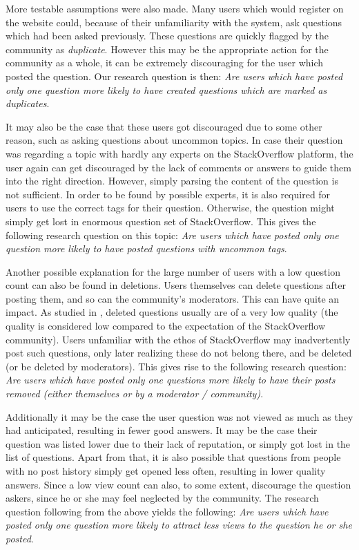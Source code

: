 \documentclass[conference]{IEEEtran}
\begin{document}
More testable assumptions were also made. Many users which would register on
the website could, because of their unfamiliarity with the system, ask
questions which had been asked previously. These questions are quickly flagged
by the community as \textit{duplicate}. However this may be the appropriate
action for the community as a whole, it can be extremely discouraging for the
user which posted the question. Our research question is then: \textit{Are
users which have posted only one question more likely to have created questions
which are marked as duplicates}.

It may also be the case that these users got discouraged due to some other
reason, such as asking questions about uncommon topics. In case their question
was regarding a topic with hardly any experts on the StackOverflow platform,
the user again can get discouraged by the lack of comments or answers to guide
them into the right direction. However, simply parsing the content of the
question is not sufficient. In order to be found by possible experts, it is
also required for users to use the correct tags for their question. Otherwise,
the question might simply get lost in enormous question set of StackOverflow.
This gives the following research question on this topic: \textit{Are users
which have posted only one question more likely to have posted questions with
uncommon tags}.

Another possible explanation for the large number of users with a low question
count can also be found in deletions. Users themselves can delete questions
after posting them, and so can the community's moderators. This can have quite
an impact. As studied in \cite{correa2014chaff}, deleted questions usually are
of a very low quality (the quality is considered low compared to the
expectation of the StackOverflow community). Users unfamiliar with the ethos of
StackOverflow may inadvertently post such questions, only later realizing these
do not belong there, and be deleted (or be deleted by moderators). This gives
rise to the following research question: \textit{Are users which have posted
only one questions more likely to have their posts removed (either themselves
or by a moderator / community)}.

Additionally it may be the case the user question was not viewed as much as
they had anticipated, resulting in fewer good answers. It may be the case their
question was listed lower due to their lack of reputation, or simply got lost
in the list of questions. Apart from that, it is also possible that questions
from people with no post history simply get opened less often, resulting in
lower quality answers. Since a low view count can also, to some extent,
discourage the question askers, since he or she may feel neglected by the
community. The research question following from the above yields the following:
\textit{Are users which have posted only one question more likely to attract
less views to the question he or she posted}.
\end{document}
